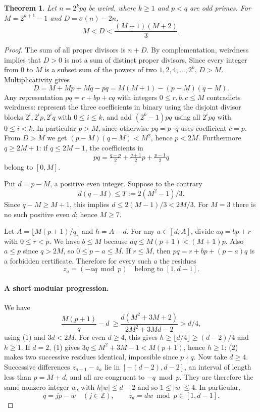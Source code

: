 \documentclass[11pt]{article}
\newtheorem*{theorem}{Theorem}
\begin{document}
\begin{theorem}
Let \(n=2^kpq\) be weird, where \(k\ge1\) and \(p<q\) are odd primes. For \(M=2^{k+1}-1\) and \(D=\sigma(n)-2n\),
\[
                 M<D<\frac{(M+1)(M+2)}{3}.
\]
\end{theorem}
\begin{proof}
The sum of all proper divisors is \(n+D\). By complementation, weirdness implies that \(D>0\) is not a sum of distinct proper divisors. Since every integer from 0 to \(M\) is a subset sum of the powers of two \(1,2,4,\ldots,2^k\), \(D>M\). Multiplicativity gives
\[
 D=M+Mp+Mq-pq=M(M+1)-(p-M)(q-M).
\]
Any representation \(pq=r+bp+cq\) with integers \(0\le r,b,c\le M\) contradicts weirdness: represent the three coefficients in binary using the disjoint divisor blocks \(2^i,2^ip,2^iq\) with \(0\le i\le k\), and add \((2^k-1)pq\) using all \(2^ipq\) with \(0\le i<k\). In particular \(p>M\), since otherwise \(pq=p\cdot q\) uses coefficient \(c=p\). From \(D>M\) we get \((p-M)(q-M)<M^2\), hence \(p<2M\). Furthermore \(q\ge 2M+1\): if \(q\le 2M-1\), the coefficients in
\[
 pq=\tfrac{q-p}{2}+\tfrac{q+1}{2}p+\tfrac{p-1}{2}q
\]
belong to \([0,M]\).

Put \(d=p-M\), a positive even integer. Suppose to the contrary
\[
 d(q-M)\le T:=2(M^2-1)/3. \tag{1}
\]
Since \(q-M\ge M+1\), this implies \(d\le 2(M-1)/3<2M/3\). For \(M=3\) there is no such positive even \(d\); hence \(M\ge7\).

Let \(A=\lfloor M(p+1)/q\rfloor\) and \(h=A-d\). For any \(a\in[d,A]\), divide \(aq=bp+r\) with \(0\le r<p\). We have \(b\le M\) because \(aq\le M(p+1)<(M+1)p\). Also \(a\le p\) since \(q>2M\), so \(0\le p-a\le M\). If \(r\le M\), then \(pq=r+bp+(p-a)q\) is a forbidden certificate. Therefore for every such \(a\) the residues
\[
 z_a=(-aq\bmod p)\quad\text{belong to }[1,d-1]. \tag{2}
\]
\paragraph{A short modular progression.} We have
\[
 \frac{M(p+1)}q-d\ \ge \frac{d(M^2+3M+2)}{2M^2+3Md-2}>d/4,
\]
using (1) and \(3d<2M\). For even \(d\ge4\), this gives \(h\ge\lfloor d/4\rfloor\ge(d-2)/4\) and \(h\ge1\). If \(d=2\), (1) gives \(3q\le M^2+3M-1<M(p+1)\), hence \(h\ge1\); (2) makes two successive residues identical, impossible since \(p\nmid q\). Now take \(d\ge4\). Successive differences \(z_{a+1}-z_a\) lie in \([-(d-2),d-2]\), an interval of length less than \(p=M+d\), and all are congruent to \(-q\bmod p\). They are therefore the same nonzero integer \(w\), with \(h|w|\le d-2\) and so \(1\le |w|\le4\). In particular,
\[
 q=jp-w\quad(j\in\mathbb Z),\qquad z_d=dw\bmod p\in[1,d-1]. \tag{3}
\]


\end{proof}
\end{document}
